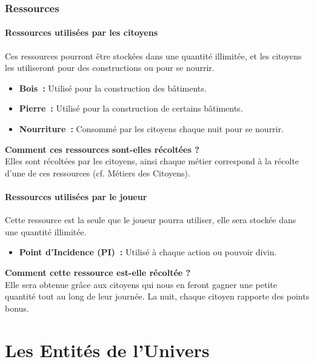 \documentclass[a4paper]{article}
\begin{document}

    \section{Ressources}

      \subsection{Ressources utilisées par les citoyens}
        Ces ressources pourront être stockées dans une quantité illimitée, et les citoyens les utiliseront pour des constructions ou pour se nourrir.
        \begin{itemize}
          \item \textbf{Bois :} \small{ Utilisé pour la construction des bâtiments.}
          \item \textbf{Pierre :} \small{ Utilisé pour la construction de certains bâtiments.}
          \item \textbf{Nourriture :} \small{ Consommé par les citoyens chaque nuit pour se nourrir.}
        \end{itemize}
        \textbf{Comment ces ressources sont-elles récoltées ? }\\Elles sont récoltées par les citoyens, ainsi chaque métier correspond à la récolte d'une de ces ressources (cf. Métiers des Citoyens).

      \subsection{Ressources utilisées par le joueur}
        Cette ressource est la seule que le joueur pourra utiliser, elle sera stockée dans une quantité illimitée.
        \begin{itemize}
          \item \textbf{Point d'Incidence (PI) :} \small{ Utilisé à chaque action ou pouvoir divin.}
        \end{itemize}
        \textbf{Comment cette ressource est-elle récoltée ? }\\Elle sera obtenue grâce aux citoyens qui nous en feront gagner une petite quantité tout au long de leur journée. La nuit, chaque citoyen rapporte des points bonus.


  \newpage
  \part{Les Entités de l'Univers}
\end{document}
